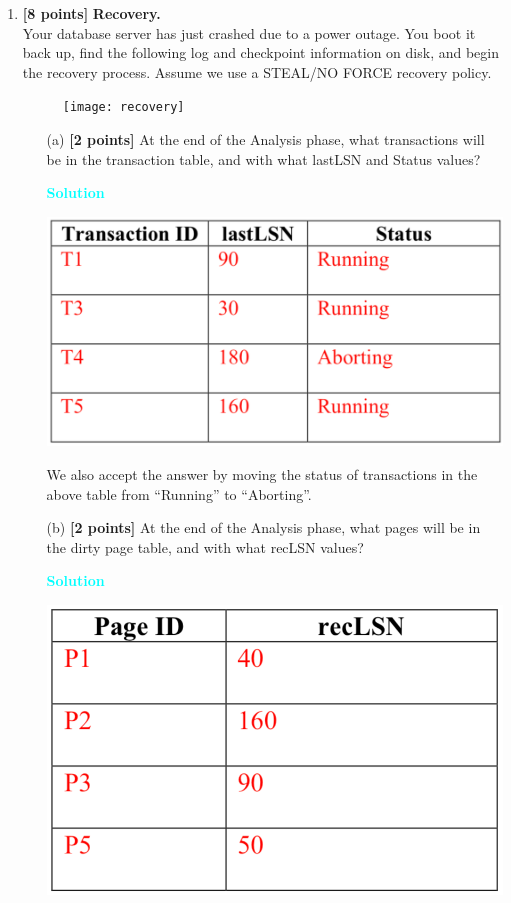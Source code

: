 \documentclass[10pt]{article}
\newenvironment{solution}
    { \begin{mdframed}[backgroundcolor=gray!10] \textcolor{cyan}{\textbf{Solution}} \\}
    {  \end{mdframed}}
\begin{document}
\begin{enumerate}
	\item \textbf{[8 points]} \textbf{Recovery.} \\
	      Your database server has just crashed due to a power outage.
	      You boot it back up, find the following log and checkpoint information on disk,
	      and begin the recovery process. Assume we use a STEAL/NO FORCE recovery policy.
	      \begin{figure}[h]
		      \centering
		      \texttt{[image: recovery]}
		      \label{fig:recovery}
	      \end{figure}
	      \begin{itemize}
		      \item[(a)] \textbf{[2 points]}
		            At the end of the Analysis phase, what transactions will be in the transaction table,
		            and with what lastLSN and Status values?
		            \begin{solution}
			            \begin{center}
				            \includegraphics[width=.6\linewidth]{Xact_sol.png}
			            \end{center}
					\end{solution}
					We also accept the answer by moving the status of transactions in the above table from ``Running'' to ``Aborting''.
		      \item[(b)] \textbf{[2 points]}
		            At the end of the Analysis phase, what pages will be in the dirty page table, and with what recLSN values?
		            \begin{solution}
			            \begin{center}
				            \includegraphics[width=.45\linewidth]{DPT_sol.png}

\end{center}
\end{solution}
\end{itemize}
\end{enumerate}
\end{document}
